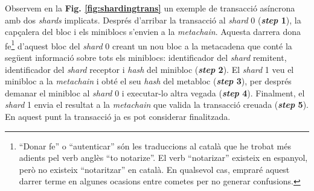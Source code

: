 \documentclass[11pt,a4paper]{article}
\begin{document}
Observem en la \textbf{Fig. \ref{fig:shardingtrans}} un exemple de transacció asíncrona amb dos \textit{shards} implicats. Després d'arribar la transacció al \textit{shard} 0 (\textbf{\textit{step} 1}), la capçalera del bloc i els miniblocs s'envien a la \textit{metachain}. Aquesta darrera dona fe\footnote{``Donar fe'' o ``autenticar'' són les traduccions al català que he trobat més adients pel verb anglès ``to notarize''. El verb ``notarizar'' existeix en espanyol, però no existeix ``notaritzar'' en català. En qualsevol cas, empraré aquest darrer terme en algunes ocasions entre cometes per no generar confusions.} d'aquest bloc del \textit{shard} 0 creant un nou bloc a la metacadena que conté la següent informació sobre tots els miniblocs: identificador del \textit{shard} remitent, identificador del \textit{shard} receptor i \textit{hash} del minibloc (\textbf{\textit{step} 2}). El \textit{shard} 1 veu el minibloc a la \textit{metachain} i obté el seu \textit{hash} del metabloc (\textbf{\textit{step} 3}), per després demanar el minibloc al \textit{shard} 0 i executar-lo altra vegada (\textbf{\textit{step} 4}). Finalment, el \textit{shard} 1 envia el resultat a la \textit{metachain} que valida la transacció creuada (\textbf{\textit{step} 5}). En aquest punt la transacció ja es pot considerar finalitzada.
\end{document}
